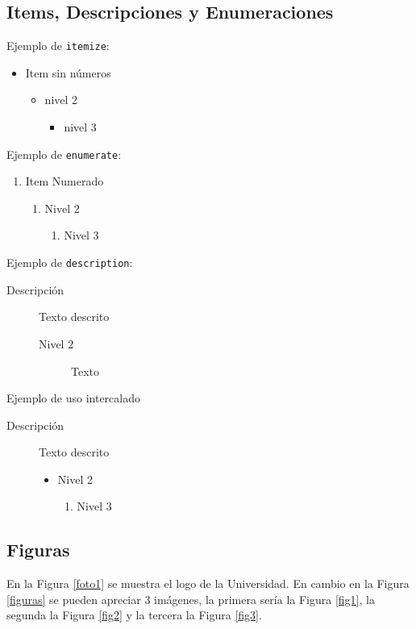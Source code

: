 \subsection{Items, Descripciones y Enumeraciones}
Ejemplo de \texttt{itemize}:

  \begin{itemize}
  \item Item sin números
    \begin{itemize}
  \item nivel 2
    \begin{itemize}
    \item nivel 3
    \end{itemize}
  \end{itemize}
\end{itemize}

Ejemplo de \texttt{enumerate}:
\begin{enumerate}
  \item Item Numerado
    \begin{enumerate}
     \item Nivel 2
    \begin{enumerate}
      \item Nivel 3
    \end{enumerate}
  \end{enumerate}
\end{enumerate}

Ejemplo de \texttt{description}:
\begin{description}
  \item[Descripción] Texto descrito
  \begin{description}
  \item[Nivel 2] Texto
\end{description}
\end{description}

Ejemplo de uso intercalado

\begin{description}
  \item[Descripción] Texto descrito
  \begin{itemize}
  \item Nivel 2
  \begin{enumerate}
      \item Nivel 3
    \end{enumerate}
\end{itemize}
\end{description}



\subsection{Figuras}
En la Figura \ref{foto1} se muestra el logo de la Universidad. En cambio en la Figura \ref{figuras} se pueden apreciar 3 imágenes, la primera sería la Figura \ref{fig1}, la segunda la Figura \ref{fig2} y la tercera la Figura \ref{fig3}. 

